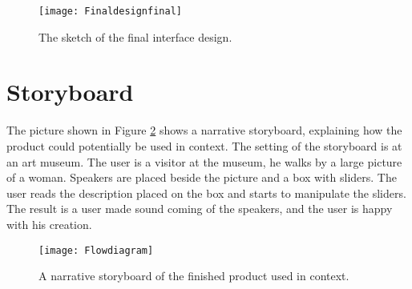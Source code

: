 \begin{figure}[!h] 
\centering
\texttt{[image: Finaldesignfinal]}
\caption{\label{fig:finaldesignsketch3grey} The sketch of the final interface design.}
\end{figure}  

\section{Storyboard}\label{sec:storyboard}

The picture shown in Figure \ref{fig:Flowdiagram} shows a narrative storyboard, explaining how the product could potentially be used in context. The setting of the storyboard is at an art museum. The user is a visitor at the museum, he walks by a large picture of a woman. Speakers are placed beside the picture and a box with sliders. The user reads the description placed on the box and starts to manipulate the sliders. The result is a user made sound coming of the speakers, and the user is happy with his creation. 

\begin{figure}[!h] 
\centering
\texttt{[image: Flowdiagram]}
\caption{\label{fig:Flowdiagram} A narrative storyboard of the finished product used in context.}
\end{figure}






